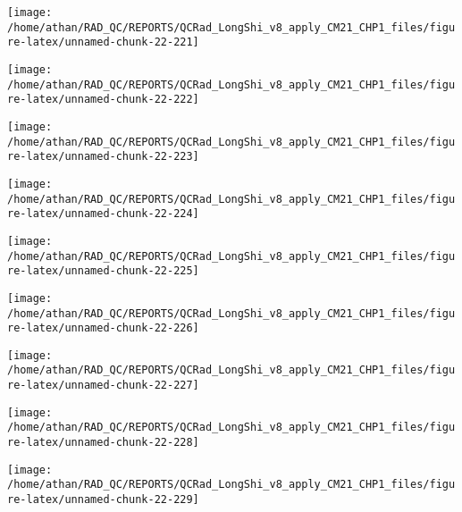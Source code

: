 \documentclass[
  10pt,
  a4paper,oneside]{article}
\begin{document}
\begin{center}\texttt{[image: /home/athan/RAD\_QC/REPORTS/QCRad\_LongShi\_v8\_apply\_CM21\_CHP1\_files/figure-latex/unnamed-chunk-22-221]} \end{center}

\begin{center}\texttt{[image: /home/athan/RAD\_QC/REPORTS/QCRad\_LongShi\_v8\_apply\_CM21\_CHP1\_files/figure-latex/unnamed-chunk-22-222]} \end{center}

\begin{center}\texttt{[image: /home/athan/RAD\_QC/REPORTS/QCRad\_LongShi\_v8\_apply\_CM21\_CHP1\_files/figure-latex/unnamed-chunk-22-223]} \end{center}

\begin{center}\texttt{[image: /home/athan/RAD\_QC/REPORTS/QCRad\_LongShi\_v8\_apply\_CM21\_CHP1\_files/figure-latex/unnamed-chunk-22-224]} \end{center}

\begin{center}\texttt{[image: /home/athan/RAD\_QC/REPORTS/QCRad\_LongShi\_v8\_apply\_CM21\_CHP1\_files/figure-latex/unnamed-chunk-22-225]} \end{center}

\begin{center}\texttt{[image: /home/athan/RAD\_QC/REPORTS/QCRad\_LongShi\_v8\_apply\_CM21\_CHP1\_files/figure-latex/unnamed-chunk-22-226]} \end{center}

\begin{center}\texttt{[image: /home/athan/RAD\_QC/REPORTS/QCRad\_LongShi\_v8\_apply\_CM21\_CHP1\_files/figure-latex/unnamed-chunk-22-227]} \end{center}

\begin{center}\texttt{[image: /home/athan/RAD\_QC/REPORTS/QCRad\_LongShi\_v8\_apply\_CM21\_CHP1\_files/figure-latex/unnamed-chunk-22-228]} \end{center}

\begin{center}\texttt{[image: /home/athan/RAD\_QC/REPORTS/QCRad\_LongShi\_v8\_apply\_CM21\_CHP1\_files/figure-latex/unnamed-chunk-22-229]} \end{center}
\end{document}
